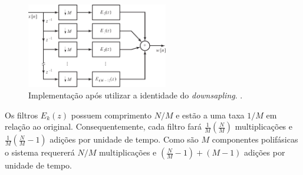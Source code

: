 \begin{frame}[allowframebreaks]
        \begin{figure}[h!]
        \centering
        \includegraphics[width=0.55\textwidth]{images/fig440.pdf}
        \caption{Implementação após utilizar a identidade do \textit{downsapling}. \citep{oppenheim2009}.}
        \label{fig:fig440}
        \end{figure}

  Os filtros $E_k(z)$ possuem comprimento $N/M$ e estão a uma taxa $1/M$ em relação ao original.
  Consequentemente, cada filtro fará $\frac{1}{M}\left(\frac{N}{M}\right)$ multiplicações 
  e $\frac{1}{M}\left(\frac{N}{M}-1\right)$ adições por unidade de tempo. Como são $M$ componentes 
  polifásicas o sistema requererá $N/M$ multiplicações e $\left(\frac{N}{M}-1\right)+(M-1)$ adições
  por unidade de tempo.

\end{frame}


